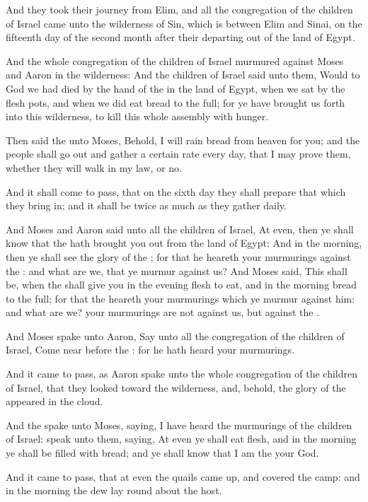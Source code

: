 \verse And they took their journey from Elim, and all the congregation of the children of Israel came unto the wilderness of Sin, which is between Elim and Sinai, on the fifteenth day of the second month after their departing out of the land of Egypt.

\verse And the whole congregation of the children of Israel murmured against Moses and Aaron in the wilderness: \verse And the children of Israel said unto them, Would to God we had died by the hand of the \LORD in the land of Egypt, when we sat by the flesh pots, and when we did eat bread to the full; for ye have brought us forth into this wilderness, to kill this whole assembly with hunger.

\verse Then said the \LORD unto Moses, Behold, I will rain bread from heaven for you; and the people shall go out and gather a certain rate every day, that I may prove them, whether they will walk in my law, or no.

\verse And it shall come to pass, that on the sixth day they shall prepare that which they bring in; and it shall be twice as much as they gather daily.

\verse And Moses and Aaron said unto all the children of Israel, At even, then ye shall know that the \LORD hath brought you out from the land of Egypt: \verse And in the morning, then ye shall see the glory of the \LORD; for that he heareth your murmurings against the \LORD: and what are we, that ye murmur against us?  \verse And Moses said, This shall be, when the \LORD shall give you in the evening flesh to eat, and in the morning bread to the full; for that the \LORD heareth your murmurings which ye murmur against him: and what are we? your murmurings are not against us, but against the \LORD.

\verse And Moses spake unto Aaron, Say unto all the congregation of the children of Israel, Come near before the \LORD: for he hath heard your murmurings.

\verse And it came to pass, as Aaron spake unto the whole congregation of the children of Israel, that they looked toward the wilderness, and, behold, the glory of the \LORD appeared in the cloud.

\verse And the \LORD spake unto Moses, saying, \verse I have heard the murmurings of the children of Israel: speak unto them, saying, At even ye shall eat flesh, and in the morning ye shall be filled with bread; and ye shall know that I am the \LORD your God.

\verse And it came to pass, that at even the quails came up, and covered the camp: and in the morning the dew lay round about the host.

